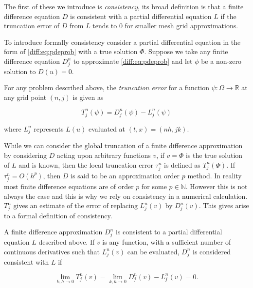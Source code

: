\documentclass[../main.tex]{subfiles}
\begin{document}
  The first of these we introduce is \emph{consistency}, its broad definition is that a finite difference equation $D$ is consistent with a partial differential equation $L$ if the truncation error of $D$ from $L$ tends to $0$ for smaller mesh grid approximations.

  To introduce formally consistency consider a partial differential equation in the form of \autoref{diff:eq:pdeprob} with a true solution $\Phi$. Suppose we take any finite difference equation $D^n_j$ to approximate \autoref{diff:eq:pdeprob} and let $\phi$ be a non-zero solution to $D(u) = 0$.

  \begin{definition}
    For any problem described above, the \emph{truncation error} for a function $\psi : \Omega \to \mathbb{R}$ at any grid point $(n, j)$ is given as

    \begin{equation}
      T^n_j(\psi) = D^n_j(\psi) - L^n_j(\psi)
    \end{equation}

    where $L^n_j$ represents $L(u)$ evaluated at $(t, x) = (n h, j k)$.
  \end{definition}

  While we can consider the global truncation of a finite difference approximation by considering $D$ acting upon arbitrary functions $v$, if $v = \Phi$ is the true solution of $L$ and is known, then the local truncation error $\tau^n_j$ is defined as $T^n_j(\Phi)$. If $\tau^n_j = O(h^p)$, then $D$ is said to be an approximation order $p$ method. In reality most finite difference equations are of order $p$ for some $p \in \mathbb{N}$. However this is not always the case and this is why we rely on consistency in a numerical calculation. $T^n_j$ gives an estimate of the error of replacing $L^n_j(v)$ by $D^n_j(v)$. This gives arise to a formal definition of consistency.

  \begin{definition}[Consistency]
    A finite difference approximation $D^n_j$ is consistent to a partial differential equation $L$ described above. If $v$ is any function, with a sufficient number of continuous derivatives such that $L^n_j(v)$ can be evaluated, $D^n_j$ is considered consistent with $L$ if

    \begin{equation}
      \lim_{k, h \to 0} T^n_j(v) = \lim_{k, h \to 0} D^n_j(v) - L^n_j(v) = 0.
    \end{equation}
  \end{definition}
\end{document}
